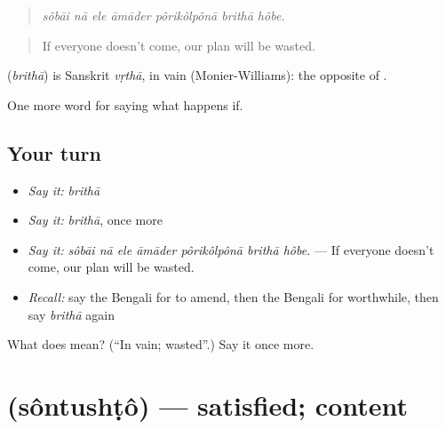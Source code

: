 \begin{quote}
      
\end{quote}

\begin{quote}
\emph{sôbāi nā ele āmāder pôrikôlpônā brithā hôbe.}
\end{quote}

\begin{quote}
If everyone doesn't come, our plan will be wasted.
\end{quote}

\begin{cousinweb}
\textbf{} (\emph{brithā}) is Sanskrit \emph{vṛthā}, in vain (Monier-Williams): the opposite of .
\end{cousinweb}

\begin{grammarlens}[title={What you've built}]
One more word for saying what happens if.
\end{grammarlens}

\subsection*{Your turn}
\begin{itemize}
\raggedright
  \item \emph{Say it:} \emph{brithā}
  \item \emph{Say it:} \emph{brithā}, once more
  \item \emph{Say it:} \emph{sôbāi nā ele āmāder pôrikôlpônā brithā hôbe.} — If everyone doesn't come, our plan will be wasted.
  \item \emph{Recall:} say the Bengali for to amend, then the Bengali for worthwhile, then say \emph{brithā} again
\end{itemize}

\begin{tcolorbox}[breakable,colback=teal!4,colframe=teal!35!black,title={Before you move on}]
What does  mean? (\textquotedblleft{}In vain; wasted\textquotedblright{}.) Say it once more.
\end{tcolorbox}
\section[\texorpdfstring{\bn{সন্তুষ্ট} (sôntushṭô)}{সন্তুষ্ট (sôntushṭô)}]{ (sôntushṭô) — satisfied; content}

\label{lesson:BN-C383-sontushto}



